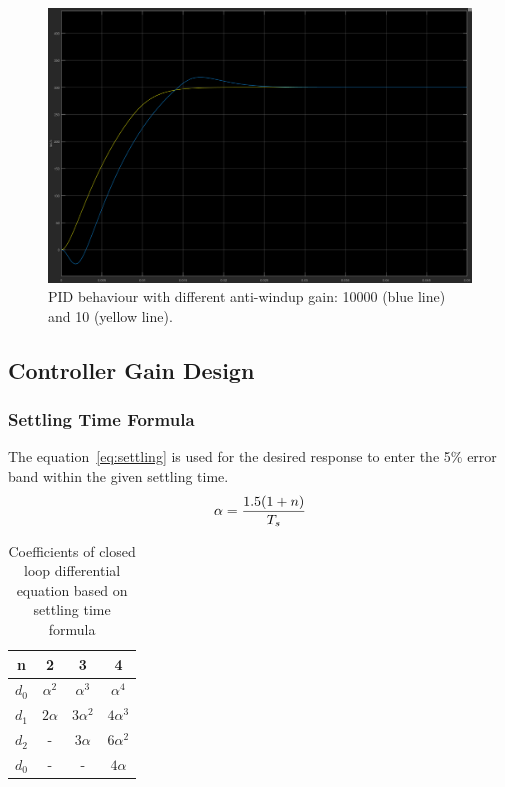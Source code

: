 \begin{figure}[!h]
	\centering
	\includegraphics[width=.75\linewidth]{graphics/pidwindupvaluecomp}
	\caption{PID behaviour with different anti-windup gain: 10000 (blue line) and 10 (yellow line).}
	\label{fig:pidwindupvaluecomp}
\end{figure}

\subsection{Controller Gain Design}

\subsubsection{Settling Time Formula}

The equation~\ref{eq:settling} is used for the desired response to enter the 5$\%$ error band within the given settling time.
\begin{equation}
\centering
\label{eq:settling}
\alpha = \dfrac{1.5(1 + n)}{T_s}
\end{equation}

\begin{table}[!h]
	\caption{ Coefficients of
		closed loop differential
		equation based on settling
		time formula\cite{feedback}}
	\centering
	\begin{tabular}{|c|c|c|c|}
		\hline
		n & 2 & 3 & 4\\
		\hline
		$d_0$ & $\alpha^2$ & $\alpha^3$ & $\alpha^4$\\ 
		$d_1$ & $2\alpha$ & $3\alpha^2$ & $4\alpha^3$\\
		$d_2$ & - & $3\alpha$ & $6\alpha^2$\\
		$d_0$ & - & - & $4\alpha$\\
		\hline	
		
	\end{tabular}
	\label{table:coefsettlingtime}
\end{table}


